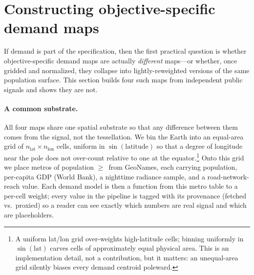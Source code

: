 %
%

\section{Constructing objective-specific demand maps}
\label{sec:signals}

If demand is part of the specification, then the first practical question is
whether objective-specific demand maps are actually \emph{different}
maps---or whether, once gridded and normalized, they collapse into
lightly-reweighted versions of the same population surface. This section
builds four such maps from independent public signals and shows they are
not.

\paragraph{A common substrate.}
All four maps share one spatial substrate so that any difference between
them comes from the signal, not the tessellation. We bin the Earth into an
equal-area grid of $n_{\text{lat}}\times n_{\text{lon}}$ cells, uniform in
$\sin(\text{latitude})$ so that a degree of longitude near the pole does not
over-count relative to one at the equator.\footnote{A uniform lat/lon grid
over-weights high-latitude cells; binning uniformly in $\sin(\text{lat})$
carves cells of approximately equal physical area. This is an
implementation detail, not a contribution, but it matters: an unequal-area
grid silently biases every demand centroid poleward.} Onto this grid we
place  metros of population $\ge$\, from
GeoNames, each carrying population, per-capita GDP (World Bank), a nighttime
radiance sample, and a road-network-reach value. Each demand model is then a
function from this metro table to a per-cell weight; every value in the
pipeline is tagged with its provenance (fetched vs.\ proxied) so a reader
can see exactly which numbers are real signal and which are placeholders.


